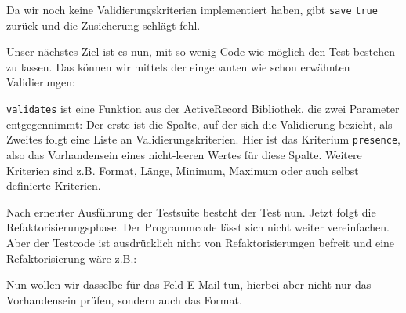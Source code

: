 Da wir noch keine Validierungskriterien implementiert haben, gibt \texttt{save} \texttt{true} zurück und die Zusicherung schlägt fehl.

Unser nächstes Ziel ist es nun, mit so wenig Code wie möglich den Test bestehen zu lassen. Das können wir mittels der eingebauten wie schon erwähnten Validierungen:

\begin{ruby}[label=app/models/job.rb]
   
      
\end{ruby}
\texttt{validates} ist eine Funktion aus der ActiveRecord Bibliothek, die zwei Parameter entgegennimmt: Der erste ist die Spalte, auf der sich die Validierung bezieht, als Zweites folgt eine Liste an Validierungskriterien. Hier ist das Kriterium \texttt{presence}, also das Vorhandensein eines nicht-leeren Wertes für diese Spalte. Weitere Kriterien sind z.B. Format, Länge, Minimum, Maximum oder auch selbst definierte Kriterien.

\tddgreen
Nach erneuter Ausführung der Testsuite besteht der Test nun. Jetzt folgt die Refaktorisierungsphase. Der Programmcode lässt sich nicht weiter vereinfachen. Aber der Testcode ist ausdrücklich nicht von Refaktorisierungen befreit und eine Refaktorisierung wäre z.B.:
\tddrefactor
\begin{ruby}[label=test/unit/job\_test.rb]
  
       
   
\end{ruby}

Nun wollen wir dasselbe für das Feld E-Mail tun, hierbei aber nicht nur das Vorhandensein prüfen, sondern auch das Format.

